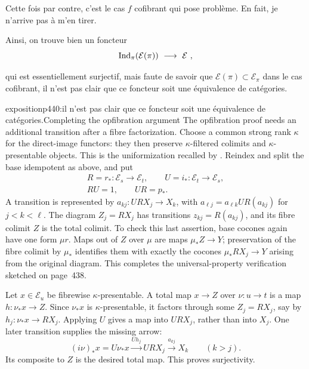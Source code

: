 Cette fois par contre, c'est le cas $f$ cofibrant qui pose problème. En fait, je n'arrive pas à m'en tirer.

Ainsi, on trouve bien un foncteur
\[
\Ind_{\pi}(\cE(\pi)) \ \longrightarrow \ \cE \ ,
\]

\setcounter{footnote}{183}

qui est essentiellement surjectif, mais faute de savoir que $\mathcal{E}(\pi) \subset \mathcal{E}_\pi$ dans le cas cofibrant, il n'est pas clair que ce foncteur soit une équivalence de catégories.

\begin{dcomment}{exposition}{p440:il n'est pas clair que ce foncteur soit une équivalence de catégories.}{Completing the opfibration argument}
The opfibration proof needs an additional transition after a fibre factorization. Choose a common strong rank $\kappa$ for the direct-image functors: they then preserve $\kappa$-filtered colimits and $\kappa$-presentable objects. This is the uniformization recalled by \citet[Introduction and proof of Theorem~2.1]{PareRosicky2013}. Reindex and split the base idempotent as above, and put
\[
 \begin{gathered}
 R=r_*:\mathcal E_s\to\mathcal E_t,
 \qquad U=i_*:\mathcal E_t\to\mathcal E_s,\\
 RU=1,\qquad UR=p_*.
 \end{gathered}
\]
A transition is represented by $a_{kj}:URX_j\to X_k$, with
$a_{\ell j}=a_{\ell k}UR(a_{kj})$ for $j<k<\ell$. The diagram $Z_j=RX_j$ has transitions $z_{kj}=R(a_{kj})$, and its fibre colimit $Z$ is the total colimit. To check this last assertion, base cocones again have one form $\mu r$. Maps out of $Z$ over $\mu$ are maps $\mu_*Z\to Y$; preservation of the fibre colimit by $\mu_*$ identifies them with exactly the cocones $\mu_*RX_j\to Y$ arising from the original diagram. This completes the universal-property verification sketched on page~438.

Let $x\in\mathcal E_u$ be fibrewise $\kappa$-presentable. A total map $x\to Z$ over $\nu:u\to t$ is a map $h:\nu_*x\to Z$. Since $\nu_*x$ is $\kappa$-presentable, it factors through some $Z_j=RX_j$, say by $h_j:\nu_*x\to RX_j$. Applying $U$ gives a map into $URX_j$, rather than into $X_j$. One later transition supplies the missing arrow:
\[
 (i\nu)_*x=U\nu_*x
       \xrightarrow{Uh_j}URX_j
       \xrightarrow{a_{kj}}X_k\qquad(k>j).
\]
Its composite to $Z$ is the desired total map. This proves surjectivity.


\end{dcomment}
